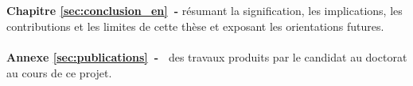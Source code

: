 \\
\\
\textbf{Chapitre \ref{sec:conclusion_en}~-} résumant la signification, les implications, les contributions et les limites de cette thèse et exposant les orientations futures.
\\
\\
\textbf{Annexe \ref{sec:publications}~-~} des travaux produits par le candidat au doctorat au cours de ce projet.